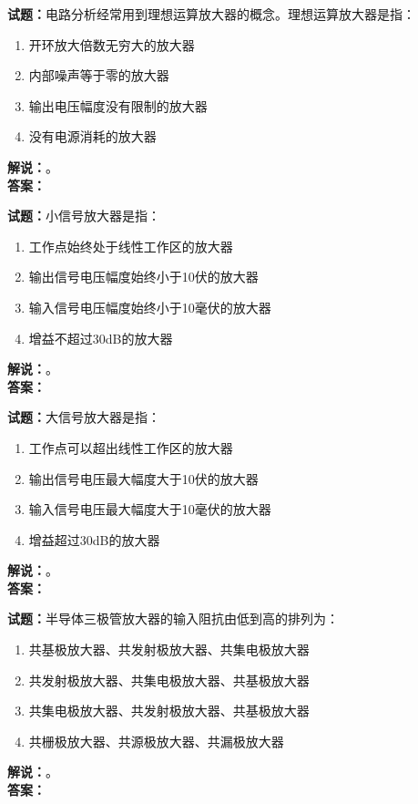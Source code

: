 \documentclass{ctexbook}
\begin{document}
\vspace{\baselineskip}

\noindent\textbf{试题：}电路分析经常用到理想运算放大器的概念。理想运算放大器是指：
\begin{enumerate}[leftmargin=3em]
  \item 开环放大倍数无穷大的放大器
  \item 内部噪声等于零的放大器
  \item 输出电压幅度没有限制的放大器
  \item 没有电源消耗的放大器
\end{enumerate}
\noindent\textbf{解说：}\textbf{}。\\\noindent\textbf{答案：}

\vspace{\baselineskip}

\noindent\textbf{试题：}小信号放大器是指：
\begin{enumerate}[leftmargin=3em]
  \item 工作点始终处于线性工作区的放大器
  \item 输出信号电压幅度始终小于10伏的放大器
  \item 输入信号电压幅度始终小于10毫伏的放大器
  \item 增益不超过30dB的放大器
\end{enumerate}
\noindent\textbf{解说：}\textbf{}。\\\noindent\textbf{答案：}

\vspace{\baselineskip}

\noindent\textbf{试题：}大信号放大器是指：
\begin{enumerate}[leftmargin=3em]
  \item 工作点可以超出线性工作区的放大器
  \item 输出信号电压最大幅度大于10伏的放大器
  \item 输入信号电压最大幅度大于10毫伏的放大器
  \item 增益超过30dB的放大器
\end{enumerate}
\noindent\textbf{解说：}\textbf{}。\\\noindent\textbf{答案：}

\vspace{\baselineskip}

\noindent\textbf{试题：}半导体三极管放大器的输入阻抗由低到高的排列为：
\begin{enumerate}[leftmargin=3em]
  \item 共基极放大器、共发射极放大器、共集电极放大器
  \item 共发射极放大器、共集电极放大器、共基极放大器
  \item 共集电极放大器、共发射极放大器、共基极放大器
  \item 共栅极放大器、共源极放大器、共漏极放大器
\end{enumerate}
\noindent\textbf{解说：}\textbf{}。\\\noindent\textbf{答案：}
\end{document}
